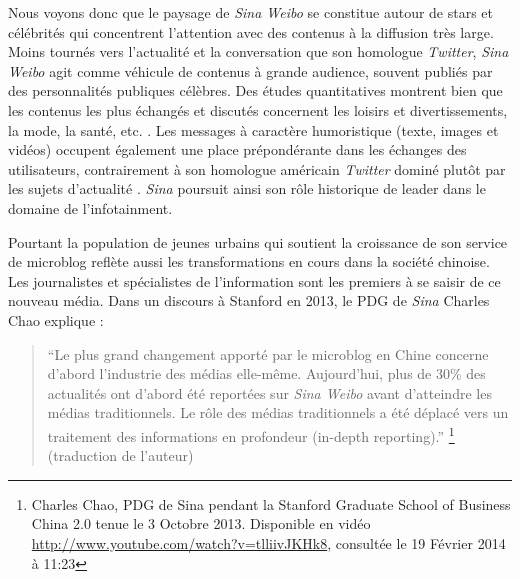Nous voyons donc que le paysage de \textit{Sina Weibo} se constitue autour de stars et célébrités qui concentrent l’attention avec des contenus à la diffusion très large. Moins tournés vers l’actualité et la conversation que son homologue \textit{Twitter}, \textit{Sina Weibo} agit comme véhicule de contenus à grande audience, souvent publiés par des personnalités publiques célèbres. Des études quantitatives montrent bien que les contenus les plus échangés et discutés concernent les loisirs et divertissements, la mode, la santé, etc. \citep{Lial2013}. Les messages à caractère humoristique (texte, images et vidéos) occupent également une place prépondérante dans les échanges des utilisateurs, contrairement à son homologue américain \textit{Twitter} dominé plutôt par les sujets d’actualité \citep{Yual2011}. \textit{Sina} poursuit ainsi son rôle historique de leader dans le domaine de l’infotainment. 

Pourtant la population de jeunes urbains qui soutient la croissance de son service de microblog reflète aussi les transformations en cours dans la société chinoise. Les journalistes et spécialistes de l’information sont les premiers à se saisir de ce nouveau média. Dans un discours à Stanford en 2013, le PDG de \textit{Sina} Charles Chao explique : 

\begin{quote}
“Le plus grand changement apporté par le microblog en Chine concerne d’abord l’industrie des médias elle-même. Aujourd’hui, plus de 30\% des actualités ont d’abord été reportées sur \textit{Sina Weibo} avant d’atteindre les médias 	traditionnels. Le rôle des médias traditionnels a été déplacé vers un traitement des informations en profondeur (in-depth reporting).” \footnote {Charles Chao, PDG de Sina pendant la Stanford Graduate School of Business China 2.0 tenue le 3 Octobre 2013. Disponible en vidéo \url{http://www.youtube.com/watch?v=tlliivJKHk8}, consultée le 19 Février 2014 à 11:23} (traduction de l’auteur)
\end{quote}

